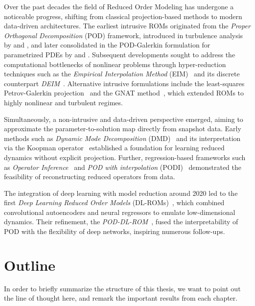 Over the past decades the field of Reduced Order Modeling has undergone a noticeable progress,
shifting from classical projection-based methods to modern data-driven architectures.
The earliest intrusive ROMs originated from the \emph{Proper Orthogonal Decomposition} (POD)
framework, introduced in turbulence analysis by \cite{lumley1967} and \cite{sirovich1987},
and later consolidated in the POD-Galerkin formulation for parametrized PDEs
by \cite{holmes1996} and \cite{kunischvolkwein2001}.
Subsequent developments sought to address the computational bottlenecks of nonlinear problems
through hyper-reduction techniques such as the \emph{Empirical Interpolation Method} (EIM)~\cite{barrault2004}
and its discrete counterpart \emph{DEIM}~\cite{chaturantabut2010}.
Alternative intrusive formulations include the least-squares Petrov-Galerkin projection~\cite{carlberg2011}
and the GNAT method~\cite{carlberg2013}, which extended ROMs to highly nonlinear and turbulent regimes.

Simultaneously, a non-intrusive and data-driven perspective emerged, aiming to approximate
the parameter-to-solution map directly from snapshot data.
Early methods such as \emph{Dynamic Mode Decomposition} (DMD)~\cite{schmid2010}
and its interpretation via the Koopman operator~\cite{rowley2009}
established a foundation for learning reduced dynamics without explicit projection.
Further, regression-based frameworks such as \emph{Operator Inference}~\cite{peherstorfer2018}
and \emph{POD with interpolation} (PODI)~\cite{barrault2004}
demonstrated the feasibility of reconstructing reduced operators from data.

The integration of deep learning with model reduction around 2020
led to the first \emph{Deep Learning Reduced Order Models} (DL-ROMs)~\cite{fresca2020},
which combined convolutional autoencoders and neural regressors to emulate low-dimensional dynamics.
Their refinement, the \emph{POD-DL-ROM}~\cite{fresca2022,brivio2023},
fused the interpretability of POD with the flexibility of deep networks,
inspiring numerous follow-ups.




\section{Outline}





In order to briefly summarize the structure of this thesis, we want to point out the line of thought here,
and remark the important results from each chapter. 


